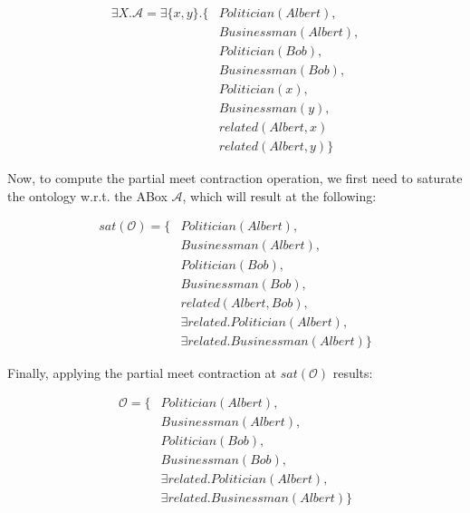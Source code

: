 \begin{equation*}
    \begin{aligned}
        \exists X.\mathcal{A} = \exists \{ x, y \}.\{ & Politician(Albert),  \\
                                                      & Businessman(Albert), \\
                                                      & Politician(Bob),     \\
                                                      & Businessman(Bob),    \\ 
                                                      & Politician(x),       \\
                                                      & Businessman(y),      \\
                                                      & related(Albert, x)   \\
                                                      & related(Albert, y)   \}
    \end{aligned}
\end{equation*}

Now, to compute the partial meet contraction operation, we first need to saturate the ontology w.r.t. the ABox $\mathcal{A}$, which will result at the following:

\begin{equation*}
    \begin{aligned}
        sat(\mathcal{O}) = \{ & Politician(Albert),   \\
                              & Businessman(Albert),  \\
                              & Politician(Bob),      \\
                              & Businessman(Bob),     \\
                              & related(Albert, Bob), \\ 
                              & \exists related.Politician(Albert), \\
                              & \exists related.Businessman(Albert) \}
    \end{aligned}
\end{equation*}

Finally, applying the partial meet contraction at $sat(\mathcal{O})$ results:

\begin{equation*}
    \begin{aligned}
        \mathcal{O} = \{ & Politician(Albert),   \\
                         & Businessman(Albert),  \\
                         & Politician(Bob),      \\
                         & Businessman(Bob),     \\
                         & \exists related.Politician(Albert), \\
                         & \exists related.Businessman(Albert) \}
    \end{aligned}
\end{equation*}

